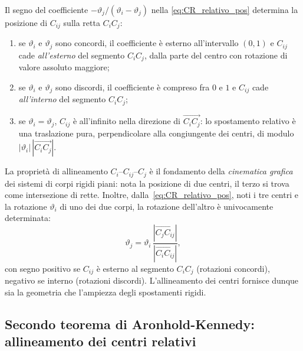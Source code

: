 


\begin{oss}
	Il segno del coefficiente $-\vartheta_j/(\vartheta_i-\vartheta_j)$ nella
	\eqref{eq:CR_relativo_pos} determina la posizione di $C_{ij}$ sulla retta
	$C_iC_j$:
	\begin{enumerate}[label=(\alph*)]
		\item se $\vartheta_i$ e $\vartheta_j$ sono concordi, il coefficiente è
		esterno all'intervallo $(0,1)$ e $C_{ij}$ cade \textit{all'esterno} del
		segmento $C_i C_j$, dalla parte del centro con rotazione di valore assoluto
		maggiore;
		\item  se $\vartheta_i$ e $\vartheta_j$ sono discordi, il coefficiente è
		compreso fra $0$ e $1$ e $C_{ij}$ cade \textit{all'interno} del segmento
		$C_i C_j$;
		\item  se $\vartheta_i = \vartheta_j$, $C_{ij}$ è all'infinito nella direzione
		di $\overrightarrow{C_i C_j}$: lo spostamento relativo è una traslazione
		pura, perpendicolare alla congiungente dei centri, di modulo
		$|\vartheta_i|\,|\overrightarrow{C_i C_j}|$.
	\end{enumerate}
\end{oss}

\begin{oss}
	La proprietà di allineamento $C_i$--$C_{ij}$--$C_j$ è il fondamento della
	\textit{cinematica grafica} dei sistemi di corpi
	rigidi piani: nota la posizione di due centri, il terzo si trova come
	intersezione di rette. Inoltre, dalla~\eqref{eq:CR_relativo_pos}, noti i tre
	centri e la rotazione $\vartheta_i$ di uno dei due corpi, la rotazione
	dell'altro è univocamente determinata:
	\begin{equation}\label{eq:rot_da_centri}
		\vartheta_j = \vartheta_i\,
		\frac{|\overrightarrow{C_j C_{ij}}|}
		{|\overrightarrow{C_i C_{ij}}|},
	\end{equation}
	con segno positivo se $C_{ij}$ è esterno al segmento $C_i C_j$ (rotazioni
	concordi), negativo se interno (rotazioni discordi). L'allineamento dei centri
	fornisce dunque sia la geometria che l'ampiezza degli spostamenti rigidi. 
	



\end{oss}


\subsection{Secondo teorema di Aronhold-Kennedy: allineamento dei centri relativi}
\label{sec:allineamento_relativi}

